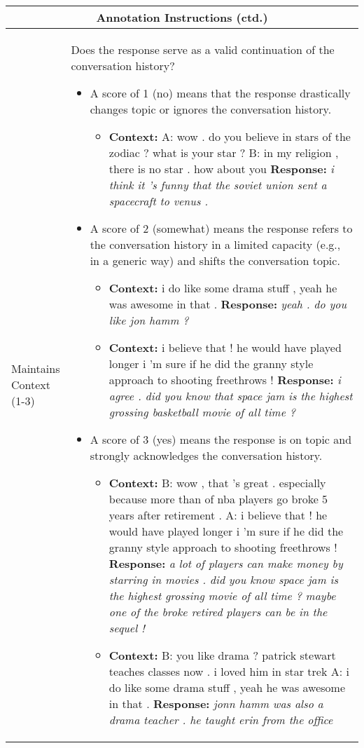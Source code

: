 \documentclass[11pt,a4paper]{article}
\begin{document}
\begin{table*}
    \begin{tabular}{|p{0.1\linewidth}|p{0.9\linewidth}|}
        \hline
        \multicolumn{2}{|c|}{\textbf{Annotation Instructions (ctd.)}} \\ \hline
  
        Maintains Context (1-3) &  Does the response serve as a valid continuation of the conversation history?
        \begin{itemize}
            \item A score of 1 (no) means that the response drastically changes topic or ignores the conversation history. \begin{itemize}
                \item \textbf{Context:} A: wow . do you believe in stars of the zodiac ? what is your star ? B: in my religion , there is no star . how about you \textbf{Response:} \textit{i think it 's funny that the soviet union sent a spacecraft to venus .}
            \end{itemize}
            \item A score of 2 (somewhat) means the response refers to the conversation history in a limited capacity (e.g., in a generic way) and shifts the conversation topic. \begin{itemize}
                \item \textbf{Context:} i do like some drama stuff , yeah he was awesome in that . \textbf{Response:} \textit{yeah . do you like jon hamm ?}
                \item \textbf{Context:}  i believe that ! he would have played longer i 'm sure if he did the granny style approach to shooting freethrows ! \textbf{Response:} \textit{i agree . did you know that space jam is the highest grossing basketball movie of all time ?}
            \end{itemize}
            \item A score of 3 (yes) means the response is on topic and strongly acknowledges the conversation history.  \begin{itemize}
                \item \textbf{Context:}  B: wow , that 's great . especially because more than of nba players go broke 5 years after retirement . A: i believe that ! he would have played longer i 'm sure if he did the granny style approach to shooting freethrows ! \textbf{Response:} \textit{a lot of players can make money by starring in movies . did you know space jam is the highest grossing movie of all time ? maybe one of the broke retired players can be in the sequel !}
                \item \textbf{Context:} B: you like drama ? patrick stewart teaches classes now . i loved him in star trek A: i do like some drama stuff , yeah he was awesome in that . \textbf{Response:} \textit{jonn hamm was also a drama teacher . he taught erin from the office}
            \end{itemize}            
        \end{itemize} \\ \hline


\end{tabular}
\end{table*}
\end{document}
